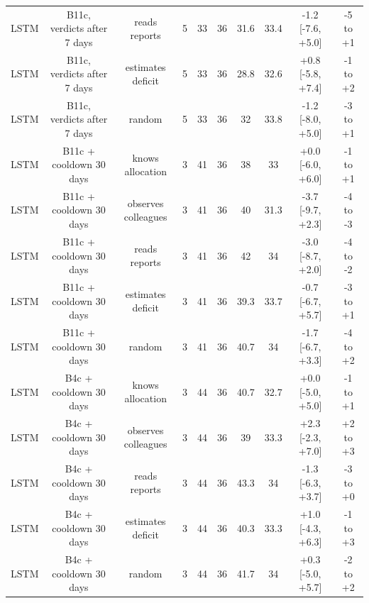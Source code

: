 \documentclass[10pt,onecolumn,letterpaper]{article}
\begin{document}
\begin{table}[!t]
{\begin{tabular}{lccccccccc}
LSTM & B11c, verdicts after 7 days & reads reports & 5 & 33 & 36 & 31.6 & 33.4 & -1.2 [-7.6, +5.0] & -5 to +1 \\
LSTM & B11c, verdicts after 7 days & estimates deficit & 5 & 33 & 36 & 28.8 & 32.6 & +0.8 [-5.8, +7.4] & -1 to +2 \\
LSTM & B11c, verdicts after 7 days & random & 5 & 33 & 36 & 32 & 33.8 & -1.2 [-8.0, +5.0] & -3 to +1 \\
LSTM & B11c + cooldown 30 days & knows allocation & 3 & 41 & 36 & 38 & 33 & +0.0 [-6.0, +6.0] & -1 to +1 \\
LSTM & B11c + cooldown 30 days & observes colleagues & 3 & 41 & 36 & 40 & 31.3 & -3.7 [-9.7, +2.3] & -4 to -3 \\
LSTM & B11c + cooldown 30 days & reads reports & 3 & 41 & 36 & 42 & 34 & -3.0 [-8.7, +2.0] & -4 to -2 \\
LSTM & B11c + cooldown 30 days & estimates deficit & 3 & 41 & 36 & 39.3 & 33.7 & -0.7 [-6.7, +5.7] & -3 to +1 \\
LSTM & B11c + cooldown 30 days & random & 3 & 41 & 36 & 40.7 & 34 & -1.7 [-6.7, +3.3] & -4 to +2 \\
LSTM & B4c + cooldown 30 days & knows allocation & 3 & 44 & 36 & 40.7 & 32.7 & +0.0 [-5.0, +5.0] & -1 to +1 \\
LSTM & B4c + cooldown 30 days & observes colleagues & 3 & 44 & 36 & 39 & 33.3 & +2.3 [-2.3, +7.0] & +2 to +3 \\
LSTM & B4c + cooldown 30 days & reads reports & 3 & 44 & 36 & 43.3 & 34 & -1.3 [-6.3, +3.7] & -3 to +0 \\
LSTM & B4c + cooldown 30 days & estimates deficit & 3 & 44 & 36 & 40.3 & 33.3 & +1.0 [-4.3, +6.3] & -1 to +3 \\
LSTM & B4c + cooldown 30 days & random & 3 & 44 & 36 & 41.7 & 34 & +0.3 [-5.0, +5.7] & -2 to +2 \\
\bottomrule
\end{tabular}}
\end{table}
\end{document}
